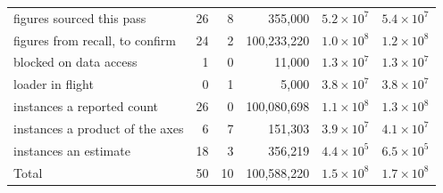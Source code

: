 \begin{table}[H]
\begin{tabular}{@{}l r r r r r@{}}
figures sourced this pass & 26 & 8 & 355,000 & $5.2\times 10^{7}$ & $5.4\times 10^{7}$ \\
figures from recall, to confirm & 24 & 2 & 100,233,220 & $1.0\times 10^{8}$ & $1.2\times 10^{8}$ \\
blocked on data access & 1 & 0 & 11,000 & $1.3\times 10^{7}$ & $1.3\times 10^{7}$ \\
loader in flight & 0 & 1 & 5,000 & $3.8\times 10^{7}$ & $3.8\times 10^{7}$ \\
instances a reported count & 26 & 0 & 100,080,698 & $1.1\times 10^{8}$ & $1.3\times 10^{8}$ \\
instances a product of the axes & 6 & 7 & 151,303 & $3.9\times 10^{7}$ & $4.1\times 10^{7}$ \\
instances an estimate & 18 & 3 & 356,219 & $4.4\times 10^{5}$ & $6.5\times 10^{5}$ \\
\midrule
Total & 50 & 10 & 100,588,220 & $1.5\times 10^{8}$ & $1.7\times 10^{8}$ \\
\bottomrule
\end{tabular}
\end{table}
